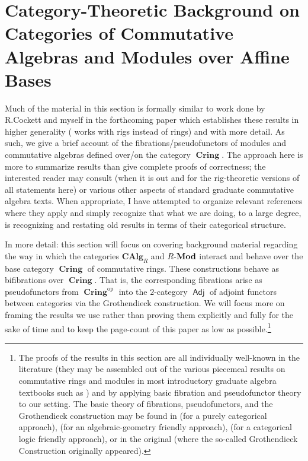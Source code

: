 \documentclass{amsart}
\theoremstyle{definition}
\DeclareMathOperator{\Cring}{\mathbf{Cring}}
\DeclareMathOperator{\Adj}{\mathsf{Adj}}
\DeclareMathOperator{\op}{op}
\newcommand{\CAlg}[1]{\mathbf{CAlg}_{#1}}
\newcommand{\Mod}[1]{{#1}\textnormal{-}\mathbf{Mod}}
\numberwithin{equation}{subsection}
\begin{document}
\section{Category-Theoretic Background on Categories of Commutative Algebras and Modules over Affine Bases}\label{Section: Background Alg}


Much of the material in this section is formally similar to work done by R.\@ Cockett and myself in the forthcoming paper \cite{RobinMePartialMapRigs} which establishes these results in higher generality (\cite{RobinMePartialMapRigs} works with rigs instead of rings) and with more detail. As such, we give a brief account of the fibrations/pseudofunctors of modules and commutative algebras defined over/on the category $\Cring$. The approach here is more to summarize results than give complete proofs of correctness; the interested reader may consult \cite{RobinMePartialMapRigs} (when it is out and for the rig-theoretic versions of all statements here) or various other aspects of standard graduate commutative algebra texts. When appropriate, I have attempted to organize relevant references where they apply and simply recognize that what we are doing, to a large degree, is recognizing and restating old results in terms of their categorical structure.

In more detail: this section will focus on covering background material regarding the way in which the categories $\CAlg{R}$ and $\Mod{R}$ interact and behave over the base category $\Cring$ of commutative rings. These constructions behave as bifibrations over $\Cring$. That is, the corresponding fibrations arise as pseudofunctors from $\Cring^{\op}$ into the $2$-category $\Adj$ of adjoint functors between categories via the Grothendieck construction. We will focus more on framing the results we use rather than proving them explicitly and fully for the sake of time and to keep the page-count of this paper as low as possible.\footnote{The proofs of the results in this section are all individually well-known in the literature (they may be assembled out of the various piecemeal results on commutative rings and modules in most introductory graduate algebra textbooks such as \cite{Eisenbud}) and by applying basic fibration and pseudofunctor theory to our setting. The basic theory of fibrations, pseudofunctors, and the Grothendieck construction may be found in \cite[Chapter 8.1 -- 8.3]{BorceuxHandBook2} (for a purely categorical approach), \cite[Section 3]{Vistoli} (for an algebraic-geometry friendly approach), \cite[Chapter 1]{Jacobs} (for a categorical logic friendly approach), or in the original \cite[Expos{\'e} VI]{SGA1} (where the so-called Grothendieck Construction originally appeared).}
\end{document}

